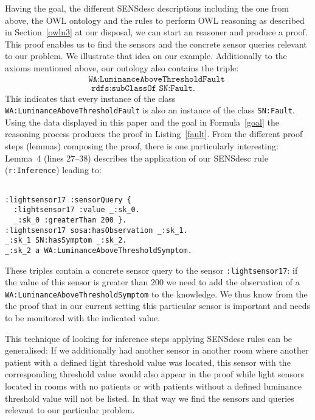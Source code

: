 Having the goal, the different SENSdesc descriptions including the one from above, the OWL ontology and the \nthree rules to perform OWL reasoning 
as described in Section~\ref{owln3}
at our disposal, we can start an \nthree 
reasoner and produce a proof. 
This proof enables us to find the sensors and the concrete sensor queries relevant to our problem. We illustrate that idea on  our example.
Additionally to the axioms mentioned above, our ontology also contains the triple:
\begin{multline}
\texttt{WA:LuminanceAboveThresholdFault }\\ \texttt{ rdfs:subClassOf SN:Fault.}
\end{multline}
This indicates that every instance of the class \texttt{WA:LuminanceAboveThresholdFault} is also an instance of the class \texttt{SN:Fault}.
Using the data displayed in this paper and the goal in Formula~\ref{goal} the reasoning process produces the proof in Listing~\ref{fault}. 
From the different proof steps (lemmas) composing the proof, there is one particularly interesting:  Lemma~4 (lines 27--38) describes 
the application of our SENSdesc rule (\texttt{r:Inference}) leading to:
%
\small
\begin{verbatim}

:lightsensor17 :sensorQuery {
  :lightsensor17 :value _:sk_0.
  _:sk_0 :greaterThan 200 }.
:lightsensor17 sosa:hasObservation _:sk_1.
_:sk_1 SN:hasSymptom _:sk_2.
_:sk_2 a WA:LuminanceAboveThresholdSymptom.

\end{verbatim}
\normalsize
%
These triples contain a concrete sensor query to the sensor \texttt{:lightsensor17}: 
if the value of this sensor is greater than 200 we need to add
the observation of a \texttt{WA:LuminanceAboveThresholdSymptom} 
to the knowledge. 
We thus know from the the proof that in our current setting 
this particular sensor is important and needs to be monitored with the indicated value. 

This technique of looking for inference steps applying SENSdesc rules can be generalised: 
If we additionally had another sensor in another room where another patient with a defined light threshold value was located, 
this sensor with the corresponding threshold value 
would also appear in the proof while light sensors located in rooms with no patients or with patients 
without a defined luminance threshold value will not be listed. In that way we find the sensors and queries relevant to our particular problem.

